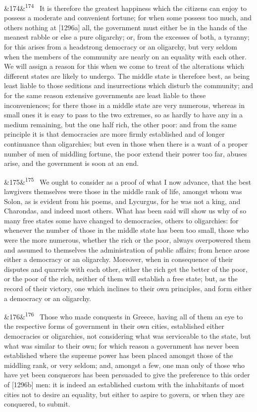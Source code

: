 \documentclass[12pt]{article}
\newcommand{\para}[1][]{\par\noindent\ifx&#1&\else\textsuperscript{\footnotesize #1}~\fi}
\begin{document}
\para[174] It is therefore the greatest happiness which the citizens can enjoy to possess a moderate and convenient fortune; for when some possess too much, and others nothing at [1296a] all, the government must either be in the hands of the meanest rabble or else a pure oligarchy; or, from the excesses of both, a tyranny; for this arises from a headstrong democracy or an oligarchy, but very seldom when the members of the community are nearly on an equality with each other. We will assign a reason for this when we come to treat of the alterations which different states are likely to undergo. The middle state is therefore best, as being least liable to those seditions and insurrections which disturb the community; and for the same reason extensive governments are least liable to these inconveniences; for there those in a middle state are very numerous, whereas in small ones it is easy to pass to the two extremes, so as hardly to have any in a medium remaining, but the one half rich, the other poor: and from the same principle it is that democracies are more firmly established and of longer continuance than oligarchies; but even in those when there is a want of a proper number of men of middling fortune, the poor extend their power too far, abuses arise, and the government is soon at an end.

\para[175] We ought to consider as a proof of what I now advance, that the best lawgivers themselves were those in the middle rank of life, amongst whom was Solon, as is evident from his poems, and Lycurgus, for he was not a king, and Charondas, and indeed most others. What has been said will show us why of so many free states some have changed to democracies, others to oligarchies: for whenever the number of those in the middle state has been too small, those who were the more numerous, whether the rich or the poor, always overpowered them and assumed to themselves the administration of public affairs; from hence arose either a democracy or an oligarchy. Moreover, when in consequence of their disputes and quarrels with each other, either the rich get the better of the poor, or the poor of the rich, neither of them will establish a free state; but, as the record of their victory, one which inclines to their own principles, and form either a democracy or an oligarchy.

\para[176] Those who made conquests in Greece, having all of them an eye to the respective forms of government in their own cities, established either democracies or oligarchies, not considering what was serviceable to the state, but what was similar to their own; for which reason a government has never been established where the supreme power has been placed amongst those of the middling rank, or very seldom; and, amongst a few, one man only of those who have yet been conquerors has been persuaded to give the preference to this order of [1296b] men: it is indeed an established custom with the inhabitants of most cities not to desire an equality, but either to aspire to govern, or when they are conquered, to submit.
\end{document}
